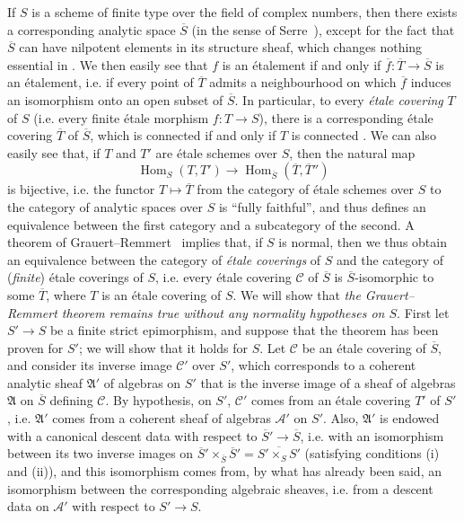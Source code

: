 \documentclass{article}
\theoremstyle{plain}
\theoremstyle{definition}
\newcommand{\sh}[1]{{\mathscr{#1}}}
\newcommand{\fk}[1]{{\mathfrak{#1}}}
\DeclareMathOperator{\Hom}{Hom}
\newcommand{\oldpage}[1]{\marginpar{\footnotesize$\Big\vert$ \textit{p.~#1}}}
\begin{document}
If $S$ is a scheme of finite type over the field of complex numbers, then there exists a corresponding analytic space $\overline{S}$ (in the sense of Serre~\cite{5}), except for the fact that $\overline{S}$ can have nilpotent elements in its structure sheaf, which changes nothing essential in \cite{5}.
We then easily see that $f$ is an \'{e}talement if and only if $\overline{f}\colon\overline{T}\to\overline{S}$ is an \'{e}talement, i.e. if every point of $\overline{T}$ admits a neighbourhood on which $\overline{f}$ induces an isomorphism onto an open subset of $\overline{S}$.
In particular, to every \emph{\'{e}tale covering} $T$ of $S$ (i.e. every finite \'{e}tale morphism $f\colon T\to S$), there is a corresponding \'{e}tale covering $\overline{T}$ of $\overline{S}$, which is connected if and only if $T$ is connected \cite{5}.
We can also easily see that, if $T$ and $T'$ are \'{e}tale schemes over $S$, then the natural map
\[
  \Hom_S(T,T') \to \Hom_{\overline{S}}(\overline{T},\overline{T}'')
\]
is bijective, i.e. the functor $T\mapsto\overline{T}$ from the category of \'{e}tale schemes over $S$ to the category of analytic spaces over $S$ is ``fully faithful'', and thus defines an equivalence between the first category and a subcategory of the second.
A theorem of Grauert--Remmert~\cite{2} implies that, if $S$ is normal, then we thus obtain an equivalence between the category of \emph{\'{e}tale coverings} of $S$ and the category of (\emph{finite}) \'{e}tale coverings of $S$, i.e. every \'{e}tale covering $\sh{C}$ of $\overline{S}$ is $\overline{S}$-isomorphic to some $\overline{T}$, where $T$ is an \'{e}tale covering of $S$.
We will show that \emph{the Grauert--Remmert theorem remains true without any normality hypotheses on $S$}.
First let $S'\to S$ be a finite strict epimorphism, and suppose that
\oldpage{190-11}
the theorem has been proven for $S'$; we will show that it holds for $S$.
Let $\sh{C}$ be an \'{e}tale covering of $\overline{S}$, and consider its inverse image $\sh{C}'$ over $S'$, which corresponds to a coherent analytic sheaf $\fk{A}'$ of algebras on $S'$ that is the inverse image of a sheaf of algebras $\fk{A}$ on $\overline{S}$ defining $\sh{C}$.
By hypothesis, on $S'$, $\sh{C}'$ comes from an \'{e}tale covering $T'$ of $S'$, i.e. $\fk{A}'$ comes from a coherent sheaf of algebras $\sh{A}'$ on $S'$.
Also, $\fk{A}'$ is endowed with a canonical descent data with respect to $\overline{S}'\to\overline{S}$, i.e. with an isomorphism between its two inverse images on $\overline{S}'\times_{\overline{S}}\overline{S}'=\overline{S'\times_SS'}$ (satisfying conditions (i) and (ii)), and this isomorphism comes from, by what has already been said, an isomorphism between the corresponding algebraic sheaves, i.e. from a descent data on $\sh{A}'$ with respect to $S'\to S$.
\end{document}
